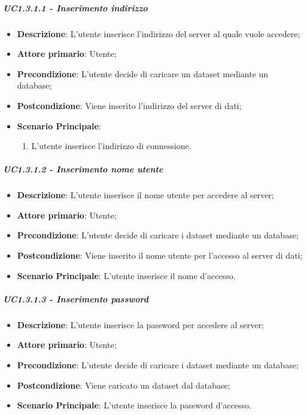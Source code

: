 \subparagraph{UC1.3.1.1 - Inserimento indirizzo}
\label{spar:uc1.3.1.1}
\begin{itemize}
    \item \textbf{Descrizione}: L'utente inserisce l'indirizzo del server al quale vuole accedere;
    \item \textbf{Attore primario}: Utente;
   
    \item \textbf{Precondizione}:   L'utente decide di caricare un dataset mediante un database;
    \item \textbf{Postcondizione}:  Viene inserito l'indirizzo del server di dati;
    
    \item \textbf{Scenario Principale}: 
    \begin{enumerate}
        \item L'utente inserisce l'indirizzo di connessione.
    \end{enumerate}

\end{itemize}


\subparagraph{UC1.3.1.2 - Inserimento nome utente}
\label{spar:uc1.3.1.2}
\begin{itemize}
    \item \textbf{Descrizione}: L'utente inserisce il nome utente per accedere al server;
    \item \textbf{Attore primario}: Utente;
    
    \item \textbf{Precondizione}:   L'utente decide di caricare i dataset mediante un database;
    \item \textbf{Postcondizione}:  Viene inserito il nome utente per l'accesso al server di dati;

    \item \textbf{Scenario Principale}: L'utente inserisce il nome d'accesso.
\end{itemize}


\subparagraph{UC1.3.1.3 - Inserimento password}
\label{spar:uc1.3.1.3}
\begin{itemize}
    \item \textbf{Descrizione}: L'utente inserisce la password per accedere al server;
    \item \textbf{Attore primario}: Utente;
    
    \item \textbf{Precondizione}:   L'utente decide di caricare i dataset mediante un database;
    \item \textbf{Postcondizione}:  Viene caricato un dataset dal database;

    \item \textbf{Scenario Principale}: L'utente inserisce la password d'accesso.

\end{itemize}

